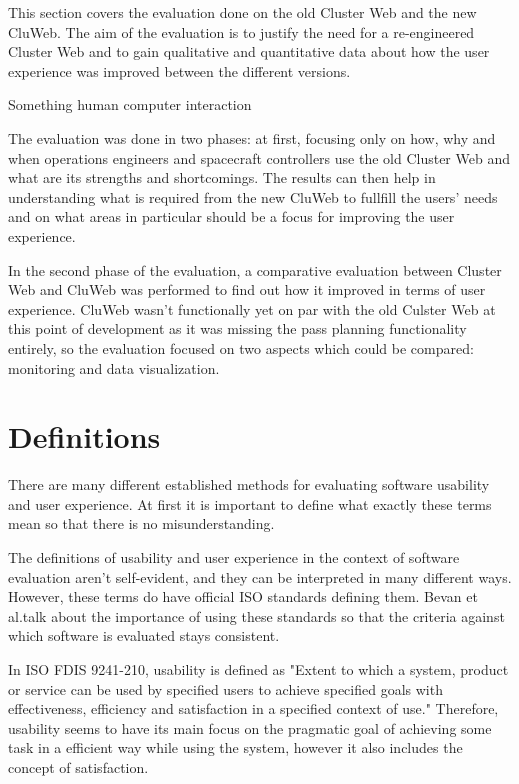 
This section covers the evaluation done on the old Cluster Web and the new CluWeb. The aim of the evaluation is to justify the need for a re-engineered Cluster Web and to gain qualitative and quantitative data about how the user experience was improved between the different versions.

Something human computer interaction \cite{4839639}

The evaluation was done in two phases: at first, focusing only on how, why and when operations engineers and spacecraft controllers use the old Cluster Web and what are its strengths and shortcomings. The results can then help in understanding what is required from the new CluWeb to fullfill the users' needs and on what areas in particular should be a focus for improving the user experience.

In the second phase of the evaluation, a comparative evaluation between Cluster Web and CluWeb was performed to find out how it improved in terms of user experience. CluWeb wasn't functionally yet on par with the old Culster Web at this point of development as it was missing the pass planning functionality entirely, so the evaluation focused on two aspects which could be compared: monitoring and data visualization.

\section{Definitions}

There are many different established methods for evaluating software usability and user experience. At first it is important to define what exactly these terms mean so that there is no misunderstanding.

The definitions of usability and user experience in the context of software evaluation aren't self-evident, and they can be interpreted in many different ways. However, these terms do have official ISO standards defining them. Bevan et al.talk about the importance of using these standards so that the criteria against which software is evaluated stays consistent. \cite{bevanstandard}

In  ISO FDIS 9241-210, usability is defined as "Extent to which  a system, product or service can be used by specified users to achieve specified goals with effectiveness, efficiency and satisfaction in a specified context of use." Therefore, usability seems to have its main focus on the pragmatic goal of achieving some task in a efficient way while using the system, however it also includes the concept of satisfaction.

